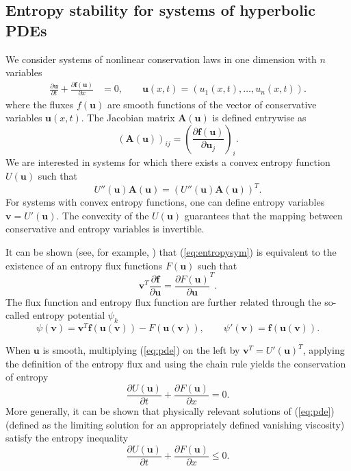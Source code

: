 \documentclass[preprint,10pt]{article}
\theoremstyle{definition}
\theoremstyle{lemma}
\theoremstyle{theorem}
\theoremstyle{assumption}
\newcommand{\pd}[2]{\frac{\partial#1}{\partial#2}}
\newcommand{\LRp}[1]{\left( #1 \right)}
\newcommand{\note}[1]{{\color{blue}{#1}}}
\begin{document}
\subsection{Entropy stability for systems of hyperbolic PDEs}


We consider systems of nonlinear conservation laws in one dimension with $n$ variables
\begin{align}
\pd{\bm{u}}{t} + \pd{\bm{f(\bm{u})}}{x} &= 0, \qquad \bm{u}(x,t) = (u_1(x,t),\ldots,u_n(x,t)).
\label{eq:pde}
\end{align}
where the fluxes $f(\bm{u})$ are smooth functions of the vector of conservative variables $\bm{u}({x},t)$.%
The Jacobian matrix $\bm{A}(\bm{u})$ is defined entrywise as
\[
\LRp{\bm{A}(\bm{u})}_{ij} = \LRp{\pd{\bm{f}(\bm{u})}{\bm{u}_j}}_i.
\]
We are interested in systems for which there exists a convex entropy function $U(\bm{u})$ such that  
\begin{equation}
U''(\bm{u})\bm{A}(\bm{u}) = \LRp{U''(\bm{u}) \bm{A}(\bm{u})}^T.
\label{eq:entropysym}
\end{equation}
For systems with convex entropy functions, one can define entropy variables $\bm{v} = U'(\bm{u})$.  The convexity of the $U(\bm{u})$ guarantees that the mapping between conservative and entropy variables is invertible.  

It can be shown (see, for example, \cite{mock1980systems}) that (\ref{eq:entropysym}) is equivalent to the existence of an entropy flux functions $F(\bm{u})$ such that
\[
\bm{v}^T \pd{\bm{f}}{\bm{u}} = \pd{F(\bm{u})}{\bm{u}}^T.
\]
The flux function and entropy flux function are further related through the so-called entropy potential $\psi_k$ 
\[
\psi(\bm{v}) = \bm{v}^T\bm{f}(\bm{u}(\bm{v})) - F(\bm{u}(\bm{v})), \qquad \psi'(\bm{v}) = \bm{f}(\bm{u}(\bm{v})).
\]

When $\bm{u}$ is smooth, multiplying (\ref{eq:pde}) on the left by $\bm{v}^T = U'(\bm{u})^T$, applying the definition of the entropy flux and using the chain rule yields the conservation of entropy
\[
\pd{U(\bm{u})}{t} + \pd{F(\bm{u})}{{x}} = 0.
\]
More generally, it can be shown that physically relevant solutions of (\ref{eq:pde}) (defined as the limiting solution for an appropriately defined vanishing viscosity) satisfy the entropy inequality
\[
\pd{U(\bm{u})}{t} + \pd{F(\bm{u})}{{x}} \leq 0.  
\]
\end{document}
